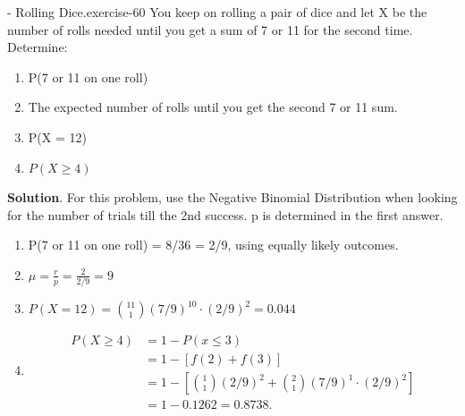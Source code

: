 \documentclass[10pt,]{book}
\numberwithin{equation}{section}
\begin{document}
\begin{inlineexercise}{- Rolling Dice.}{exercise-60}%
\hypertarget{p-928}{}%
You keep on rolling a pair of dice and let X be the number of rolls needed until you get a sum of 7 or 11 for the second time. Determine: \leavevmode%
\begin{enumerate}
\item\hypertarget{li-265}{}P(7 or 11 on one roll)%
\item\hypertarget{li-266}{}The expected number of rolls until you get the second 7 or 11 sum.%
\item\hypertarget{li-267}{}P(X = 12)%
\item\hypertarget{li-268}{}\(P(X \ge 4)\)%
\end{enumerate}
%
\textbf{Solution}.\quad%
\hypertarget{p-929}{}%
For this problem, use the Negative Binomial Distribution when looking for the number of trials till the 2nd success. p is determined in the first answer. \leavevmode%
\begin{enumerate}
\item\hypertarget{li-269}{}P(7 or 11 on one roll) = 8/36 = 2/9, using equally likely outcomes.%
\item\hypertarget{li-270}{}\(\mu = \frac{r}{p} = \frac{2}{2/9} = 9\)%
\item\hypertarget{li-271}{}\(P( X = 12) = \binom{11}{1} (7/9)^10 \cdot (2/9)^2 = 0.044\)%
\item\hypertarget{li-272}{}%
\begin{align*}
P(X \ge 4) & = 1- P(x \le 3) \\
& = 1 - [ f(2) + f(3) ]\\
& = 1 - \left[ \binom{1}{1} (2/9)^2 + \binom{2}{1} (7/9)^1 \cdot (2/9)^2 \right ]\\
& = 1 - 0.1262 = 0.8738.
\end{align*}
%
\end{enumerate}
%
\end{inlineexercise}
%
\par
\hypertarget{p-930}{}%
\end{document}
